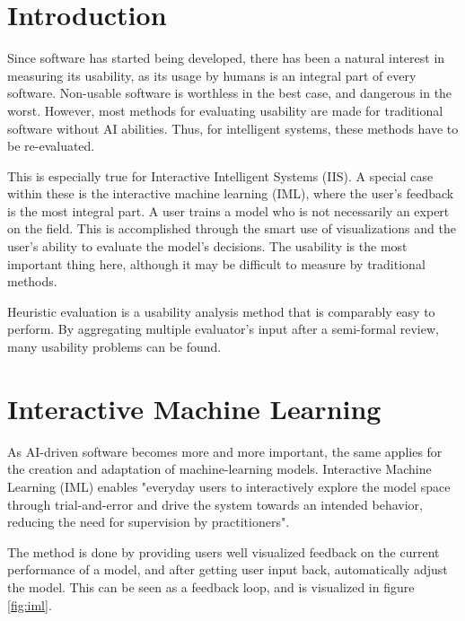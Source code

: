 \documentclass[sigchi]{acmart}
\begin{document}
\stoptocentries%
\tableofcontents
\starttocentries%

\section{Introduction}
Since software has started being developed, there has been a natural interest in measuring its usability, as its usage by humans is an integral part of every software. Non-usable software is worthless in the best case, and dangerous in the worst. However, most methods for evaluating usability are made for traditional software without AI abilities. Thus, for intelligent systems, these methods have to be re-evaluated.

This is especially true for Interactive Intelligent Systems (IIS). A special case within these is the interactive machine learning (IML), where the user's feedback is the most integral part. A user trains a model who is not necessarily an expert on the field. This is accomplished through the smart use of visualizations and the user's ability to evaluate the model's decisions. The usability is the most important thing here, although it may be difficult to measure by traditional methods.

Heuristic evaluation \cite{heureval1990} is a usability analysis method that is comparably easy to perform. By aggregating multiple evaluator's input after a semi-formal review, many usability problems can be found.

\section{Interactive Machine Learning}
As AI-driven software becomes more and more important, the same applies for the creation and adaptation of machine-learning models. Interactive Machine Learning (IML) enables "everyday users to interactively explore the
model space through trial-and-error and drive the system towards an
intended behavior, reducing the need for supervision by practitioners"\cite{reviewiml2018}.

The method is done by providing users well visualized feedback on the current performance of a model, and after getting user input back, automatically adjust the model. This can be seen as a feedback loop, and is visualized in figure \ref{fig:iml}.
\end{document}
